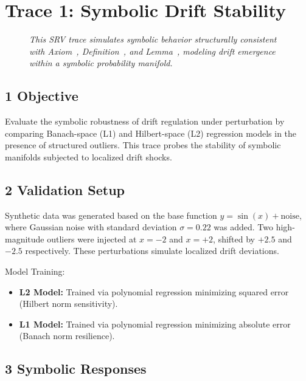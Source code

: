 \section*{Trace 1: Symbolic Drift Stability}
\label{section:trace1_symbolic_drift_stability}

\begin{figure}[htbp]
\centering
\caption[\textit{SRV trace (summary)}]{\textit{This SRV trace simulates symbolic behavior structurally consistent with Axiom~, Definition~, and Lemma~, modeling drift emergence within a symbolic probability manifold.}}
\label{figure:trace1_drift_stability_summary}
\end{figure}

\subsection*{1 Objective}
\label{subsection:trace1_objective}

Evaluate the symbolic robustness of drift regulation under perturbation by comparing Banach-space (L1) and Hilbert-space (L2) regression models in the presence of structured outliers. This trace probes the stability of symbolic manifolds subjected to localized drift shocks.

\subsection*{2 Validation Setup}
\label{subsection:trace1_validation_setup}

Synthetic data was generated based on the base function $y = \sin(x) + \text{noise}$, where Gaussian noise with standard deviation $\sigma = 0.22$ was added. Two high-magnitude outliers were injected at $x = -2$ and $x = +2$, shifted by $+2.5$ and $-2.5$ respectively. These perturbations simulate localized drift deviations.

Model Training:
\begin{itemize}
    \item \textbf{L2 Model:} Trained via polynomial regression minimizing squared error (Hilbert norm sensitivity).
    \item \textbf{L1 Model:} Trained via polynomial regression minimizing absolute error (Banach norm resilience).
\end{itemize}

\subsection*{3 Symbolic Responses}
\label{subsection:trace1_symbolic_responses}

